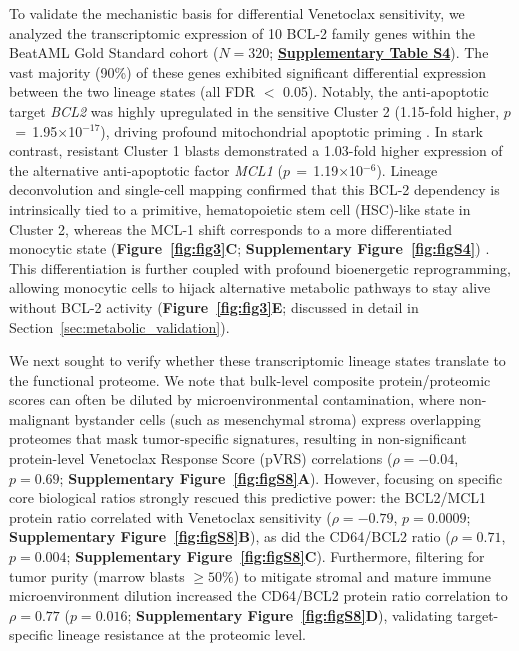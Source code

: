 \documentclass[11pt,a4paper]{article}
\newcommand{\pval}[1]{$p$\,$=$\,#1}
\begin{document}
To validate the mechanistic basis for differential Venetoclax sensitivity, we analyzed the transcriptomic expression of 10 BCL-2 family genes within the BeatAML Gold Standard cohort ($N=320$; \href{Supplementary_Methods.pdf#tab:tabS4}{\textbf{Supplementary Table S4}}). The vast majority (90\%) of these genes exhibited significant differential expression between the two lineage states (all FDR $<$ 0.05). Notably, the anti-apoptotic target \textit{BCL2} was highly upregulated in the sensitive Cluster 2 (1.15-fold higher, \pval{1.95$\times$10$^{-17}$}), driving profound mitochondrial apoptotic priming \cite{pan2014bcl2, lagadinou2013bcl2}. In stark contrast, resistant Cluster 1 blasts demonstrated a 1.03-fold higher expression of the alternative anti-apoptotic factor \textit{MCL1} (\pval{1.19$\times$10$^{-6}$}). Lineage deconvolution and single-cell mapping confirmed that this BCL-2 dependency is intrinsically tied to a primitive, hematopoietic stem cell (HSC)-like state in Cluster 2, whereas the MCL-1 shift corresponds to a more differentiated monocytic state (\textbf{Figure~\ref{fig:fig3}C}; \textbf{Supplementary Figure~\ref{fig:figS4}}) \cite{vangalen2019single}. This differentiation is further coupled with profound bioenergetic reprogramming, allowing monocytic cells to hijack alternative metabolic pathways to stay alive without BCL-2 activity (\textbf{Figure~\ref{fig:fig3}E}; discussed in detail in Section~\ref{sec:metabolic_validation}).

We next sought to verify whether these transcriptomic lineage states translate to the functional proteome. We note that bulk-level composite protein/proteomic scores can often be diluted by microenvironmental contamination, where non-malignant bystander cells (such as mesenchymal stroma) express overlapping proteomes that mask tumor-specific signatures, resulting in non-significant protein-level Venetoclax Response Score (pVRS) correlations ($\rho = -0.04$, $p = 0.69$; \textbf{Supplementary Figure~\ref{fig:figS8}A}). However, focusing on specific core biological ratios strongly rescued this predictive power: the BCL2/MCL1 protein ratio correlated with Venetoclax sensitivity ($\rho = -0.79$, $p = 0.0009$; \textbf{Supplementary Figure~\ref{fig:figS8}B}), as did the CD64/BCL2 ratio ($\rho = 0.71$, $p = 0.004$; \textbf{Supplementary Figure~\ref{fig:figS8}C}). Furthermore, filtering for tumor purity (marrow blasts $\ge 50\%$) to mitigate stromal and mature immune microenvironment dilution increased the CD64/BCL2 protein ratio correlation to $\rho = 0.77$ ($p = 0.016$; \textbf{Supplementary Figure~\ref{fig:figS8}D}), validating target-specific lineage resistance at the proteomic level.
\end{document}
